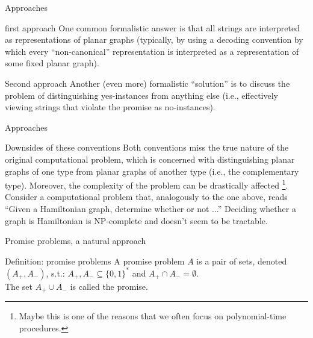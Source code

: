         \begin{frame}{Approaches}
            \begin{exampleblock}{first approach}
                One common formalistic answer is that all strings are interpreted as representations of planar graphs (typically, by using a decoding convention by which every “non-canonical” representation is interpreted as a representation of some fixed planar graph).
            \end{exampleblock}
            \pause
            \begin{exampleblock}{Second approach}
                Another (even more) formalistic “solution” is to discuss the problem of distinguishing yes-instances from anything else (i.e., effectively viewing strings that violate the promise as no-instances).
            \end{exampleblock}
        \end{frame}
        \begin{frame}{Approaches}
            \begin{block}{Downsides of these conventions}
                Both conventions miss the true nature of the original computational problem, which is concerned with distinguishing planar graphs of one type from planar graphs of another type (i.e., the complementary type).
                Moreover, the complexity of the problem can be drastically affected
                \footnote{Maybe this is one of the reasons that we often focus on polynomial-time procedures.}.
                Consider a computational problem that, analogously to the one above, reads “Given a Hamiltonian graph, determine whether or not ...” Deciding whether a graph is Hamiltonian is NP-complete and doesn't seem to be tractable.
             \end{block}
        \end{frame}
        
        \begin{frame}{Promise problems, a natural approach}
            \begin{block}{Definition: promise problems}
                A promise problem $A$ is a pair of sets, denoted $(A_+,A_-)$, s.t.: $A_+, A_- \subseteq \{0,1\}^*$ and $A_+ \cap A_- = \emptyset$.\\
                The set $A_+ \cup A_-$ is called the promise.            
            \end{block}
        \end{frame}
    
